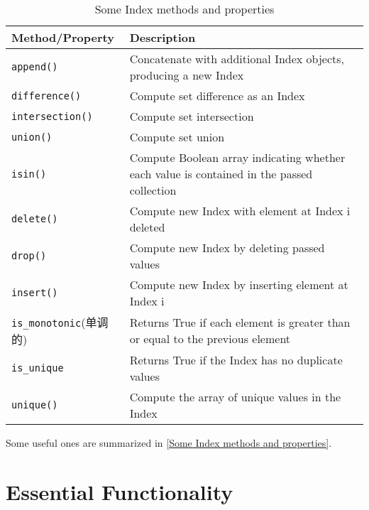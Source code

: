 \begin{table}
    \caption{Some Index methods and properties}
    \label{Some Index methods and properties}
    \begin{tabularx}{\textwidth}{lX}
        \hline
        Method/Property          & Description                                                                               \\
        \hline
        \verb|append()|          & Concatenate with additional Index objects, producing a new Index                          \\
        \verb|difference()|      & Compute set difference as an Index                                                        \\
        \verb|intersection()|    & Compute set intersection                                                                  \\
        \verb|union()|           & Compute set union                                                                         \\
        \verb|isin()|            & Compute Boolean array indicating whether each value is contained in the passed collection \\
        \verb|delete()|          & Compute new Index with element at Index i deleted                                         \\
        \verb|drop()|            & Compute new Index by deleting passed values                                               \\
        \verb|insert()|          & Compute new Index by inserting element at Index i                                         \\
        \verb|is_monotonic|(单调的) & Returns True if each element is greater than or equal to the previous element             \\
        \verb|is_unique|         & Returns True if the Index has no duplicate values                                         \\
        \verb|unique()|          & Compute the array of unique values in the Index                                           \\
        \hline
    \end{tabularx}
\end{table}

Some useful ones are summarized in \autoref{Some Index methods and properties}.
\section{Essential Functionality}

